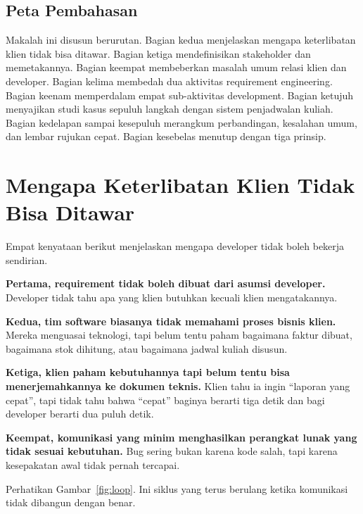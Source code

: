 \documentclass[11pt,a4paper]{article}
\begin{document}
\subsection{Peta Pembahasan}

Makalah ini disusun berurutan. Bagian kedua menjelaskan mengapa keterlibatan klien tidak bisa ditawar. Bagian ketiga mendefinisikan stakeholder dan memetakannya. Bagian keempat membeberkan masalah umum relasi klien dan developer. Bagian kelima membedah dua aktivitas requirement engineering. Bagian keenam memperdalam empat sub-aktivitas development. Bagian ketujuh menyajikan studi kasus sepuluh langkah dengan sistem penjadwalan kuliah. Bagian kedelapan sampai kesepuluh merangkum perbandingan, kesalahan umum, dan lembar rujukan cepat. Bagian kesebelas menutup dengan tiga prinsip.

\section{Mengapa Keterlibatan Klien Tidak Bisa Ditawar}

Empat kenyataan berikut menjelaskan mengapa developer tidak boleh bekerja sendirian.

\textbf{Pertama, requirement tidak boleh dibuat dari asumsi developer.} Developer tidak tahu apa yang klien butuhkan kecuali klien mengatakannya.

\textbf{Kedua, tim software biasanya tidak memahami proses bisnis klien.} Mereka menguasai teknologi, tapi belum tentu paham bagaimana faktur dibuat, bagaimana stok dihitung, atau bagaimana jadwal kuliah disusun.

\textbf{Ketiga, klien paham kebutuhannya tapi belum tentu bisa menerjemahkannya ke dokumen teknis.} Klien tahu ia ingin ``laporan yang cepat'', tapi tidak tahu bahwa ``cepat'' baginya berarti tiga detik dan bagi developer berarti dua puluh detik.

\textbf{Keempat, komunikasi yang minim menghasilkan perangkat lunak yang tidak sesuai kebutuhan.} Bug sering bukan karena kode salah, tapi karena kesepakatan awal tidak pernah tercapai.

Perhatikan Gambar~\ref{fig:loop}. Ini siklus yang terus berulang ketika komunikasi tidak dibangun dengan benar.
\end{document}
